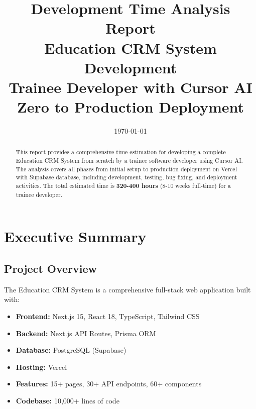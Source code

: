 \documentclass[11pt,a4paper]{article}
\title{
    \vspace{-2cm}
    \textbf{\Huge Development Time Analysis Report}\\[0.5cm]
    \Large Education CRM System Development\\
    \large Trainee Developer with Cursor AI\\
    \large Zero to Production Deployment
}
\author{}
\date{\today}
\begin{document}
\maketitle
\thispagestyle{fancy}

\vspace{-1cm}

\begin{abstract}
This report provides a comprehensive time estimation for developing a complete Education CRM System from scratch by a trainee software developer using Cursor AI. The analysis covers all phases from initial setup to production deployment on Vercel with Supabase database, including development, testing, bug fixing, and deployment activities. The total estimated time is \textbf{320-400 hours} (8-10 weeks full-time) for a trainee developer.
\end{abstract}

\tableofcontents
\newpage

\section{Executive Summary}

\subsection{Project Overview}
The Education CRM System is a comprehensive full-stack web application built with:
\begin{itemize}
    \item \textbf{Frontend:} Next.js 15, React 18, TypeScript, Tailwind CSS
    \item \textbf{Backend:} Next.js API Routes, Prisma ORM
    \item \textbf{Database:} PostgreSQL (Supabase)
    \item \textbf{Hosting:} Vercel
    \item \textbf{Features:} 15+ pages, 30+ API endpoints, 60+ components
    \item \textbf{Codebase:} 10,000+ lines of code
\end{itemize}
\end{document}
